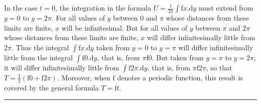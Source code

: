 \par
{}
In the case \(t=0\), the integration in the formula \(U=\frac{1}{2\pi}\int\mathrm{f}x.\mathrm{d}y\) must extend from \(y=0\) to \(y=2\pi\). For all values of \(y\) between \(0\) and \(\pi\) whose distances from these limits are finite, \(x\) will be infinitesimal. But for all values of \(y\) between \(\pi\) and \(2\pi\) whose distances from these limits are finite, \(x\) will differ infinitesimally little from \(2\pi\). Thus the integral \(\int\mathrm{f}x.\mathrm{d}y\) taken from \(y=0\) to \(y=\pi\) will differ infinitesimally little from the integral \(\int\mathrm{f}0.\mathrm{d}y\), that is, from \(\pi\mathrm{f}0\). But taken from \(y=\pi\) to \(y=2\pi\), it will differ infinitesimally little from \(\int\mathrm{f}2\pi.\mathrm{d}y\), that is, from \(\pi\mathrm{f}2\pi\), so that \(T=\frac12(\mathrm{f}0+\mathrm{f}2\pi)\). Moreover, when \(\mathrm{f}\) denotes a periodic function, this result is covered by the general formula \(T=\mathrm{f}t\).
\par\medskip\begin{center}\rule{.24\linewidth}{.3pt}\end{center}
\endgroup
